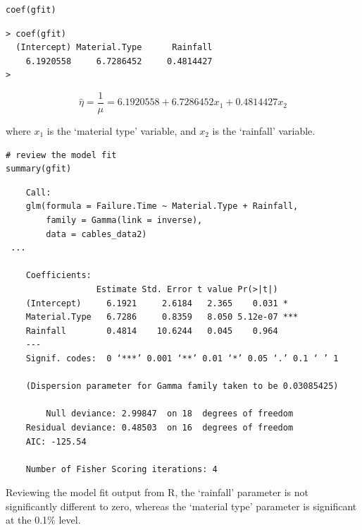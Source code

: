 \documentclass[a4paper,12pt]{article}
\begin{document}
\begin{framed}\begin{verbatim}
coef(gfit)
\end{verbatim} \end{framed}


\begin{verbatim}
> coef(gfit)
  (Intercept) Material.Type      Rainfall 
    6.1920558     6.7286452     0.4814427 
> 
\end{verbatim}



\[
\hat{\eta} = \frac{1}{\mu} 
= 6.1920558 + 6.7286452x_1 + 0.4814427x_2
\]

where $x_1$ is the ‘material type’ variable, and $x_2$ is the ‘rainfall’ variable.

\newpage 

\begin{framed}\begin{verbatim}
# review the model fit
summary(gfit)
\end{verbatim} \end{framed}


 \begin{verbatim}
    Call:
    glm(formula = Failure.Time ~ Material.Type + Rainfall, 
        family = Gamma(link = inverse), 
        data = cables_data2)
 ...
    
    Coefficients:
                  Estimate Std. Error t value Pr(>|t|)    
    (Intercept)     6.1921     2.6184   2.365    0.031 *  
    Material.Type   6.7286     0.8359   8.050 5.12e-07 ***
    Rainfall        0.4814    10.6244   0.045    0.964    
    ---
    Signif. codes:  0 ‘***’ 0.001 ‘**’ 0.01 ‘*’ 0.05 ‘.’ 0.1 ‘ ’ 1
    
    (Dispersion parameter for Gamma family taken to be 0.03085425)
    
        Null deviance: 2.99847  on 18  degrees of freedom
    Residual deviance: 0.48503  on 16  degrees of freedom
    AIC: -125.54
    
    Number of Fisher Scoring iterations: 4
\end{verbatim}
\newpage
Reviewing the model fit output from R, the ‘rainfall’ parameter is not
significantly different to zero, whereas the ‘material type’ parameter is
significant at the 0.1\% level.
\end{document}
